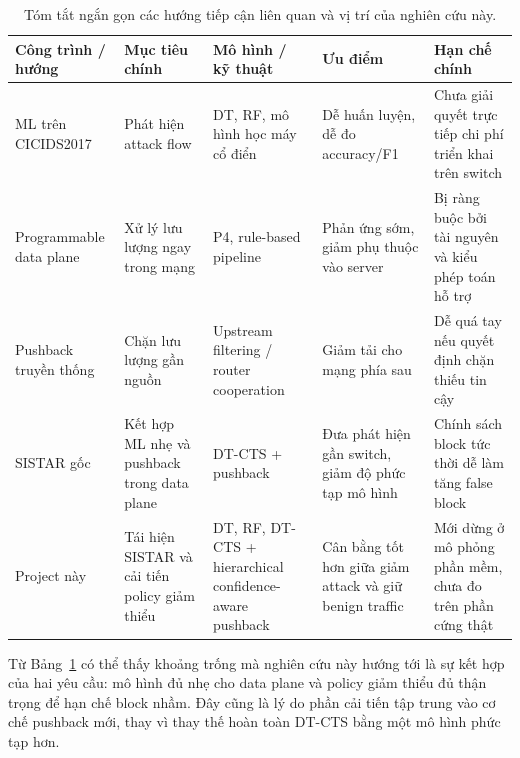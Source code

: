 \begin{table}[!htbp]
\caption{Tóm tắt ngắn gọn các hướng tiếp cận liên quan và vị trí của nghiên cứu này.}
\label{tab:sota}
\centering
\small
\setlength{\tabcolsep}{3pt}
\begin{tabular}{|p{2.2cm}|p{2.1cm}|p{2.2cm}|p{2.4cm}|p{2.2cm}|}
\hline
\textbf{Công trình / hướng} & \textbf{Mục tiêu chính} & \textbf{Mô hình / kỹ thuật} & \textbf{Ưu điểm} & \textbf{Hạn chế chính} \\
\hline
ML trên CICIDS2017 \cite{sharafaldin2018cicids,breiman2001random} & Phát hiện attack flow & DT, RF, mô hình học máy cổ điển & Dễ huấn luyện, dễ đo accuracy/F1 & Chưa giải quyết trực tiếp chi phí triển khai trên switch \\
\hline
Programmable data plane \cite{bosshart2014p4} & Xử lý lưu lượng ngay trong mạng & P4, rule-based pipeline & Phản ứng sớm, giảm phụ thuộc vào server & Bị ràng buộc bởi tài nguyên và kiểu phép toán hỗ trợ \\
\hline
Pushback truyền thống \cite{mahajan2002controlling} & Chặn lưu lượng gần nguồn & Upstream filtering / router cooperation & Giảm tải cho mạng phía sau & Dễ quá tay nếu quyết định chặn thiếu tin cậy \\
\hline
SISTAR gốc & Kết hợp ML nhẹ và pushback trong data plane & DT-CTS + pushback & Đưa phát hiện gần switch, giảm độ phức tạp mô hình & Chính sách block tức thời dễ làm tăng false block \\
\hline
Project này & Tái hiện SISTAR và cải tiến policy giảm thiểu & DT, RF, DT-CTS + hierarchical confidence-aware pushback & Cân bằng tốt hơn giữa giảm attack và giữ benign traffic & Mới dừng ở mô phỏng phần mềm, chưa đo trên phần cứng thật \\
\hline
\end{tabular}
\end{table}

Từ Bảng~\ref{tab:sota} có thể thấy khoảng trống mà nghiên cứu này hướng tới là sự kết hợp của hai yêu cầu: mô hình đủ nhẹ cho data plane và policy giảm thiểu đủ thận trọng để hạn chế block nhầm. Đây cũng là lý do phần cải tiến tập trung vào cơ chế pushback mới, thay vì thay thế hoàn toàn DT-CTS bằng một mô hình phức tạp hơn.

\FloatBarrier
